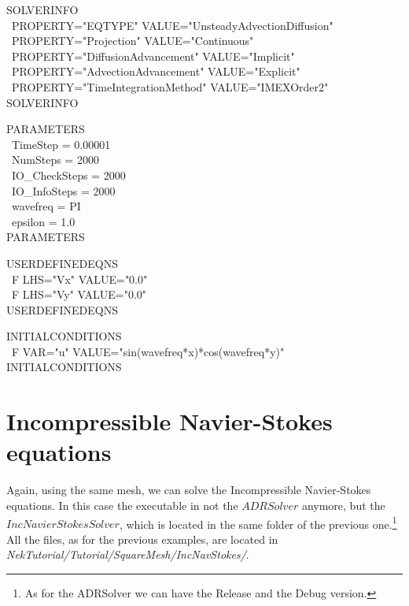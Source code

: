 \documentclass[12pt]{article}
\begin{document}
\vspace{5mm}
\begin{algorithm2e}[H]
SOLVERINFO\\\
        PROPERTY="EQTYPE" VALUE="UnsteadyAdvectionDiffusion" \\\
        PROPERTY="Projection" VALUE="Continuous"\\\
        PROPERTY="DiffusionAdvancement" VALUE="Implicit"\\\
        PROPERTY="AdvectionAdvancement" VALUE="Explicit"\\\
        PROPERTY="TimeIntegrationMethod" VALUE="IMEXOrder2"\\
SOLVERINFO\\
\end{algorithm2e}
\begin{algorithm2e}[H]
PARAMETERS\\\
      TimeStep      = 0.00001 \\\  
      NumSteps      = 2000\\\                
      IO\_CheckSteps = 2000\\\                 
      IO\_InfoSteps  = 2000\\\                 
      wavefreq = PI\\\                      
      epsilon = 1.0\\                       
 PARAMETERS\\
\end{algorithm2e}
\begin{algorithm2e}[H]
USERDEFINEDEQNS\\\
       F LHS="Vx" VALUE="0.0" \\\
       F LHS="Vy" VALUE="0.0"\\
USERDEFINEDEQNS\\
 \end{algorithm2e}
\begin{algorithm2e}[H]
 INITIALCONDITIONS\\\
        F VAR="u" VALUE="sin(wavefreq*x)*cos(wavefreq*y)" \\
    INITIALCONDITIONS\\
    \end{algorithm2e}
\vspace{5mm}

\section{Incompressible Navier-Stokes equations}

Again, using the same mesh, we can solve the Incompressible Navier-Stokes equations. In this case the executable in not the $ADRSolver$ anymore, but the $IncNavierStokesSolver$, which is located in the same folder of the previous one.\footnote{As for the ADRSolver we can have the Release and the Debug version.} All the files, as for the previous examples, are located in \emph{NekTutorial/Tutorial/SquareMesh/IncNavStokes/}.
\end{document}
